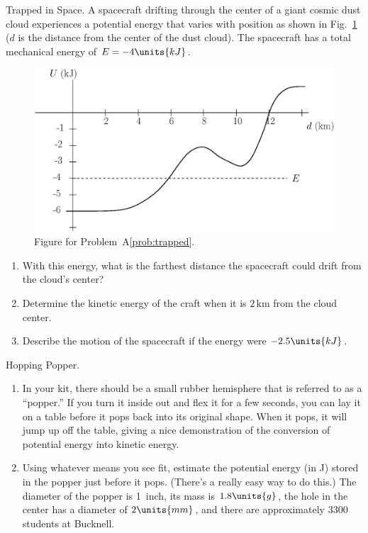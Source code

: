 \begin{aproblem}{Trapped in Space.}  
  A spacecraft drifting through the center of a giant cosmic dust
  cloud experiences a potential energy that varies with position as
  shown in Fig.~\ref{fig:trapped} ($d$ is the distance from the center
  of the dust cloud).  The spacecraft has a total mechanical energy of
  $E = -4\units{kJ}$.
  \begin{figure}[h]
    \begin{center}
    \includegraphics[width=4.5in]{additional_problems/trapped.eps}
    \end{center}
    \caption{Figure for Problem~A\ref{prob:trapped}.}
    \label{fig:trapped}
  \end{figure}
  \begin{enumerate}
  \item With this energy, what is the farthest distance the spacecraft
    could drift from the cloud's center?

  \item Determine the kinetic energy of the craft when it is $2\,
    \mbox{km}$ from the cloud center.

  \item Describe the motion of the spacecraft if the energy were
    $-2.5\units{kJ}$.
  \end{enumerate}
  \label{prob:trapped}
\end{aproblem}

\begin{aproblem}{Hopping Popper.}
  \begin{enumerate}
  \item In your kit, there should be a small rubber hemisphere that is
    referred to as a ``popper.''  If you turn it inside out and flex
    it for a few seconds, you can lay it on a table before it pops
    back into its original shape.  When it pops, it will jump up off
    the table, giving a nice demonstration of the conversion of
    potential energy into kinetic energy.

  \item Using whatever means you see fit, estimate the potential
    energy (in J) stored in the popper just before it pops.  (There's
    a really easy way to do this.)  The diameter of the popper is
    1~inch, its mass is $1.8\units{g}$, the hole in the center has a
    diameter of $2\units{mm}$, and there are approximately 3300
    students at Bucknell.
  \end{enumerate}
\end{aproblem}


